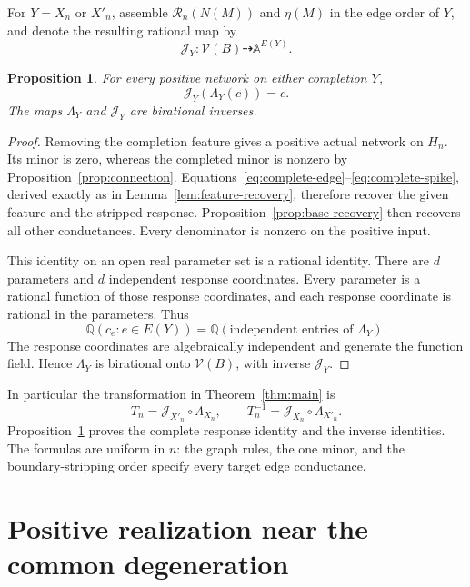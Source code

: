 \documentclass[11pt]{article}
\newtheorem{proposition}[theorem]{Proposition}
\theoremstyle{definition}
\newcommand{\Vresp}{\mathcal V}
\newcommand{\QQ}{\mathbb Q}
\newcommand{\Aparam}{\mathbb A}
\newcommand{\rec}{\mathcal R}
\newcommand{\chart}{\mathcal J}
\begin{document}
For \(Y=X_n\) or \(X'_n\), assemble \(\rec_n(N(M))\) and \(\eta(M)\)
in the edge order of \(Y\), and denote the resulting rational map by
\[
 \chart_Y:\Vresp(B)\dashrightarrow\Aparam^{E(Y)}.
\]

\begin{proposition}
\label{prop:charts}
For every positive network on either completion \(Y\),
\[
 \chart_Y(\Lambda_Y(c))=c.
\]
The maps \(\Lambda_Y\) and \(\chart_Y\) are birational inverses.
\end{proposition}
\begin{proof}
Removing the completion feature gives a positive actual
network on \(H_n\). Its minor is zero, whereas the completed
minor is nonzero by Proposition~\ref{prop:connection}.
Equations~\eqref{eq:complete-edge}--\eqref{eq:complete-spike},
derived exactly as in Lemma~\ref{lem:feature-recovery},
therefore recover the given feature and the stripped response.
Proposition~\ref{prop:base-recovery} then recovers all other conductances.
Every denominator is nonzero on the positive input.

This identity on an open real parameter set is a rational identity.
There are \(d\) parameters and \(d\) independent response coordinates.
Every parameter is a rational function of those response coordinates,
and each response coordinate is rational in the parameters. Thus
\[
 \QQ(c_e:e\in E(Y))
 =\QQ(\text{independent entries of }\Lambda_Y).
\]
The response coordinates are algebraically independent and generate
the function field. Hence \(\Lambda_Y\) is birational onto
\(\Vresp(B)\), with inverse \(\chart_Y\).

\end{proof}

In particular the transformation in Theorem~\ref{thm:main} is
\begin{equation}
 T_n=\chart_{X'_n}\circ\Lambda_{X_n},\qquad
 T_n^{-1}=\chart_{X_n}\circ\Lambda_{X'_n}.
 \label{eq:transformation}
\end{equation}
Proposition~\ref{prop:charts} proves the complete response identity and
the inverse identities. The formulas are uniform in \(n\): the graph
rules, the one minor, and the boundary-stripping order specify every
target edge conductance.

\section{Positive realization near the common degeneration}
\label{sec:positivity}
\end{document}
